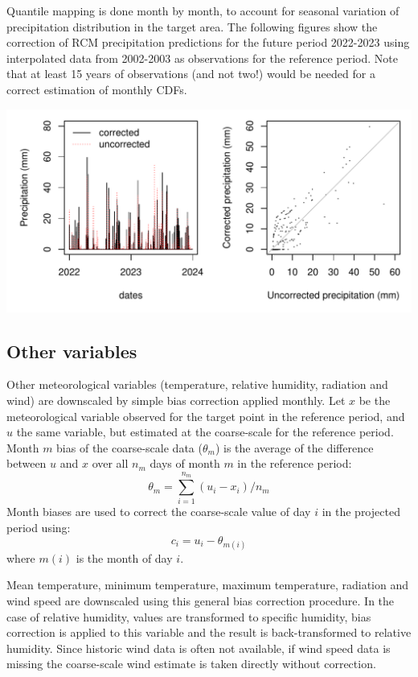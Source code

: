 \documentclass[11pt,a4paper]{article}
\begin{document}
Quantile mapping is done month by month, to account for seasonal variation of precipitation distribution in the target area. The following figures show the correction of RCM precipitation predictions for the future period 2022-2023 using interpolated data from 2002-2003 as observations for the reference period. Note that at least 15 years of observations (and not two!) would be needed for a correct estimation of monthly CDFs.
\begin{center}
\includegraphics{Meteorology-029}
\end{center}

\subsection{Other variables}
Other meteorological variables (temperature, relative humidity, radiation and wind) are downscaled by simple bias correction applied monthly. Let $x$ be the meteorological variable observed for the target point in the reference period, and $u$ the same variable, but estimated at the coarse-scale for the reference period. Month $m$ bias of the coarse-scale data ($\theta_{m}$) is the average of the difference between $u$ and $x$ over all $n_m$ days of month $m$ in the reference period:
\begin{equation}
\theta_{m} = \sum_{i=1}^{n_m}{(u_i-x_i)}/n_m
\end{equation}
Month biases are used to correct the coarse-scale value of day $i$ in the projected period using:
\begin{equation}
c_i = u_i - \theta_{m(i)}
\end{equation}
where $m(i)$ is the month of day $i$.

Mean temperature, minimum temperature, maximum temperature, radiation and wind speed are downscaled using this general bias correction procedure. In the case of relative humidity, values are transformed to specific humidity, bias correction is applied to this variable and the result is back-transformed to relative humidity. Since historic wind data is often not available, if wind speed data is missing the coarse-scale wind estimate is taken directly without correction.
\end{document}
